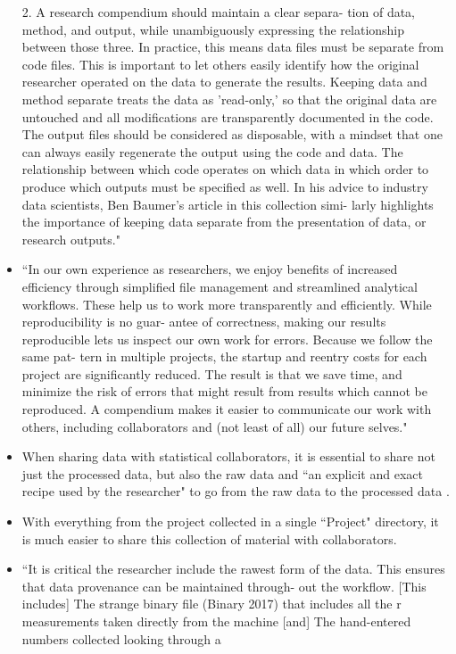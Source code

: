 \documentclass[pdftex,english,11pt,parskip=half]{scrartcl}
\begin{document}
\begin{itemize}
2. A research compendium should maintain a clear separa- tion of data, method, and output, while unambiguously expressing the relationship between those three. In practice, this means data files must be separate from code files. This is important to let others easily identify how the original researcher operated on the data to generate the results. Keeping data and method separate treats the data as 'read-only,' so that the original data are untouched and all modifications are transparently documented in the code. The output files should be considered as disposable, with a mindset that one can always easily regenerate the output using the code and data. The relationship between which code operates on which data in which order to produce which outputs must be specified as well. In his advice to industry data scientists, Ben Baumer's article in this collection simi- larly highlights the importance of keeping data separate from the presentation of data, or research outputs." \cite{marwick2018packaging} 
\item ``In our own experience as researchers, we enjoy benefits of increased efficiency through simplified file management and streamlined analytical workflows. These help us to work more transparently and efficiently. While reproducibility is no guar- antee of correctness, making our results reproducible lets us inspect our own work for errors. Because we follow the same pat- tern in multiple projects, the startup and reentry costs for each project are significantly reduced. The result is that we save time, and minimize the risk of errors that might result from results which cannot be reproduced. A compendium makes it easier to communicate our work with others, including collaborators and (not least of all) our future selves." \cite{marwick2018packaging}
\item When sharing data with statistical collaborators, it is essential to share not just the processed data, but also the raw data and ``an explicit and exact recipe used by the researcher" to go from the raw data to the processed data \cite{ellis2018share}. 
\item With everything from the project collected in a single ``Project" directory, it is much easier to share this collection of material with collaborators. 
\item ``It is critical the researcher include the rawest form of the data. This ensures that data provenance can be maintained through- out the workflow. [This includes] The strange binary file (Binary 2017) that includes all the r measurements taken directly from the machine [and] The hand-entered numbers collected looking through a

\end{itemize}
\end{document}
